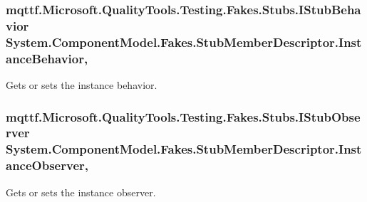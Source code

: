 \hypertarget{class_system_1_1_component_model_1_1_fakes_1_1_stub_member_descriptor_abca45706d93f7336116edc52828dd2ac}{
\subsubsection[{Instance\-Behavior}]{\setlength{\rightskip}{0pt plus 5cm}mqttf.\-Microsoft.\-Quality\-Tools.\-Testing.\-Fakes.\-Stubs.\-I\-Stub\-Behavior System.\-Component\-Model.\-Fakes.\-Stub\-Member\-Descriptor.\-Instance\-Behavior\hspace{0.3cm}{\ttfamily [get]}, {\ttfamily [set]}}}\label{class_system_1_1_component_model_1_1_fakes_1_1_stub_member_descriptor_abca45706d93f7336116edc52828dd2ac}


Gets or sets the instance behavior.

\hypertarget{class_system_1_1_component_model_1_1_fakes_1_1_stub_member_descriptor_a0634e02903a813f6925f9a5386a0c6cf}{
\subsubsection[{Instance\-Observer}]{\setlength{\rightskip}{0pt plus 5cm}mqttf.\-Microsoft.\-Quality\-Tools.\-Testing.\-Fakes.\-Stubs.\-I\-Stub\-Observer System.\-Component\-Model.\-Fakes.\-Stub\-Member\-Descriptor.\-Instance\-Observer\hspace{0.3cm}{\ttfamily [get]}, {\ttfamily [set]}}}\label{class_system_1_1_component_model_1_1_fakes_1_1_stub_member_descriptor_a0634e02903a813f6925f9a5386a0c6cf}


Gets or sets the instance observer.

